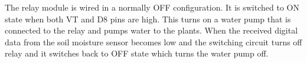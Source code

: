 The relay module is wired in a normally OFF configuration. It is
switched to ON state when both VT and D8 pins are high. This turns on
a water pump that is connected to the relay and pumps water to the
plants. When the received digital data from the soil moisture sensor
becomes low and the switching circuit turns off relay and it switches
back to OFF state which turns the water pump off.
